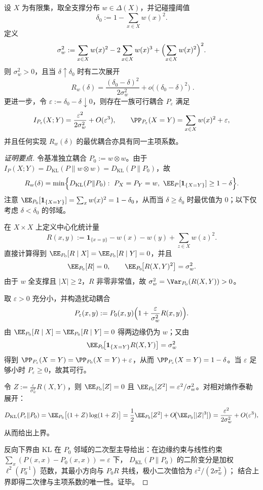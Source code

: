 \begin{theorem}[碰撞阈值处的二次律与显式信息曲率]\label{thm:pom-diagonal-rate-collision-threshold-quadratic-law}
设 \(X\) 为有限集，取全支撑分布 \(w\in\Delta(X)\)，并记碰撞阈值
\[
\delta_0:=1-\sum_{x\in X}w(x)^2.
\]
定义
\[
\sigma_w^2
:=\sum_{x\in X}w(x)^2-2\sum_{x\in X}w(x)^3+\Bigl(\sum_{x\in X}w(x)^2\Bigr)^2.
\]
则 \(\sigma_w^2>0\)，且当 \(\delta\uparrow\delta_0\) 时有二次展开
\[
\boxed{\;
R_w(\delta)=\frac{(\delta_0-\delta)^2}{2\sigma_w^2}+o\!\bigl((\delta_0-\delta)^2\bigr)\; }.
\]
更进一步，令 \(\varepsilon:=\delta_0-\delta\downarrow 0\)，则存在一族可行耦合 \(P_\varepsilon\) 满足
\[
I_{P_\varepsilon}(X;Y)=\frac{\varepsilon^2}{2\sigma_w^2}+O(\varepsilon^3),
\qquad
\PP_{P_\varepsilon}(X=Y)=\sum_{x\in X}w(x)^2+\varepsilon,
\]
并且任何实现 \(R_w(\delta)\) 的最优耦合亦具有同一主项系数。
\end{theorem}
\begin{proof}[证明要点]
令基准独立耦合 \(P_0:=w\otimes w\)。由于 \(I_P(X;Y)=D_{\mathrm{KL}}(P\|w\otimes w)=D_{\mathrm{KL}}(P\|P_0)\)，故
\[
R_w(\delta)=\min\Bigl\{D_{\mathrm{KL}}(P\|P_0):\ P_X=P_Y=w,\ \EE_P[\mathbf 1_{\{X=Y\}}]\ge 1-\delta\Bigr\}.
\]
注意 \(\EE_{P_0}[\mathbf 1_{\{X=Y\}}]=\sum_x w(x)^2=1-\delta_0\)，从而当 \(\delta\ge \delta_0\) 时最优值为 \(0\)；以下仅考虑 \(\delta<\delta_0\) 的邻域。
\par
在 \(X\times X\) 上定义中心化统计量
\[
R(x,y):=\mathbf 1_{\{x=y\}}-w(x)-w(y)+\sum_{z\in X}w(z)^2.
\]
直接计算得到 \(\EE_{P_0}[R\mid X]=\EE_{P_0}[R\mid Y]=0\)，并且
\[
\EE_{P_0}[R]=0,
\qquad
\EE_{P_0}\!\bigl[R(X,Y)^2\bigr]=\sigma_w^2.
\]
由于 \(w\) 全支撑且 \(|X|\ge 2\)，\(R\) 非零非常值，故 \(\sigma_w^2=\Var_{P_0}(R(X,Y))>0\)。
\par
取 \(\varepsilon>0\) 充分小，并构造扰动耦合
\[
P_\varepsilon(x,y):=P_0(x,y)\Bigl(1+\frac{\varepsilon}{\sigma_w^2}R(x,y)\Bigr).
\]
由 \(\EE_{P_0}[R\mid X]=\EE_{P_0}[R\mid Y]=0\) 得两边缘仍为 \(w\)；又由
\[
\EE_{P_0}\!\bigl[\mathbf 1_{\{X=Y\}}R(X,Y)\bigr]=\sigma_w^2
\]
得到 \(\PP_{P_\varepsilon}(X=Y)=\PP_{P_0}(X=Y)+\varepsilon\)，从而 \(\PP_{P_\varepsilon}(X=Y)=1-\delta\)。当 \(\varepsilon\) 足够小时 \(P_\varepsilon\ge 0\)，故其可行。
\par
令 \(Z:=\frac{\varepsilon}{\sigma_w^2}R(X,Y)\)，则 \(\EE_{P_0}[Z]=0\) 且 \(\EE_{P_0}[Z^2]=\varepsilon^2/\sigma_w^2\)。对相对熵作泰勒展开：
\[
D_{\mathrm{KL}}(P_\varepsilon\|P_0)
=\EE_{P_0}\bigl[(1+Z)\log(1+Z)\bigr]
=\frac12\EE_{P_0}[Z^2]+O\!\bigl(\EE_{P_0}[|Z|^3]\bigr)
=\frac{\varepsilon^2}{2\sigma_w^2}+O(\varepsilon^3),
\]
从而给出上界。
\par
反向下界由 KL 在 \(P_0\) 邻域的二次型主导给出：在边缘约束与线性约束 \(\sum_x(P(x,x)-P_0(x,x))=\varepsilon\) 下，
\(
D_{\mathrm{KL}}(P\|P_0)
\)
的二阶变分是加权 \(\ell^2(P_0^{-1})\) 范数，其最小方向与 \(P_0R\) 共线，极小二次值恰为 \(\varepsilon^2/(2\sigma_w^2)\)；
结合上界即得二次律与主项系数的唯一性。证毕。
\end{proof}

